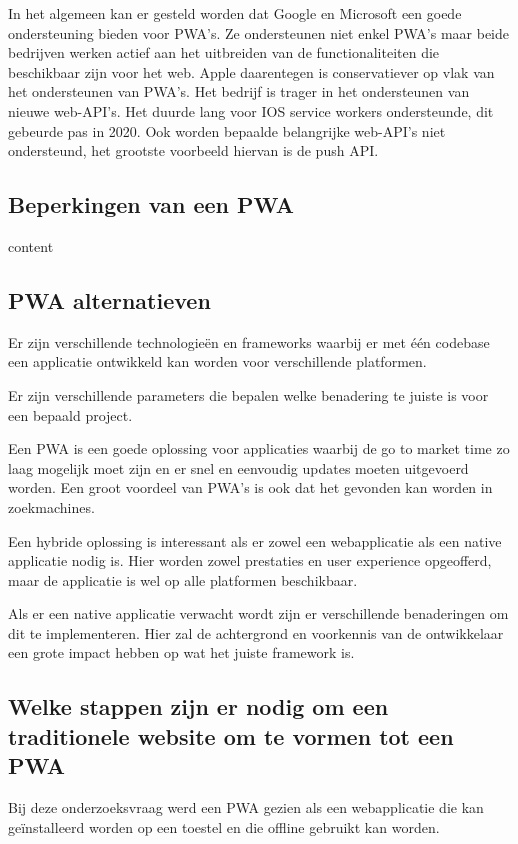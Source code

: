 		In het algemeen kan er gesteld worden dat Google en Microsoft een goede ondersteuning bieden voor PWA's. Ze ondersteunen niet enkel PWA's maar beide bedrijven werken actief aan het uitbreiden van de functionaliteiten die beschikbaar zijn voor het web. 
		Apple daarentegen is conservatiever op vlak van het ondersteunen van PWA's. Het bedrijf is trager in het ondersteunen van nieuwe web-API's. 
		Het duurde lang voor IOS service workers ondersteunde, dit gebeurde pas in 2020. Ook worden bepaalde belangrijke web-API's niet ondersteund, het grootste voorbeeld hiervan is de push API.
					
	\subsection{Beperkingen van een PWA}
		content
	
	\subsection{PWA alternatieven}
		
		Er zijn verschillende technologieën en frameworks waarbij er met één codebase een applicatie ontwikkeld kan worden voor verschillende platformen. 
		
		Er zijn verschillende parameters die bepalen welke benadering te juiste is voor een bepaald project. 
	
		Een PWA is een goede oplossing voor applicaties waarbij de go to market time zo laag mogelijk moet zijn en er snel en eenvoudig updates moeten uitgevoerd worden. Een groot voordeel van PWA's is ook dat het gevonden kan worden in zoekmachines.
		
		Een hybride oplossing is interessant als er zowel een webapplicatie als een native applicatie nodig is. Hier worden zowel prestaties en user experience opgeofferd, maar de applicatie is wel op alle platformen beschikbaar. 
		
		Als er een native applicatie verwacht wordt zijn er verschillende benaderingen om dit te implementeren. Hier zal de achtergrond en voorkennis van de ontwikkelaar een grote impact hebben op wat het juiste framework is.
	
	\subsection{Welke stappen zijn er nodig om een traditionele website om te vormen tot een PWA}
		
		Bij deze onderzoeksvraag werd een PWA gezien als een webapplicatie die kan geïnstalleerd worden op een toestel en die offline gebruikt kan worden.
		
